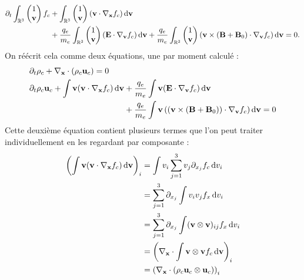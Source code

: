 $$
  \begin{aligned}
  \partial_t\int_{\mathbb{R}^3} \begin{pmatrix}
    1 \\
    \vb{v}
  \end{pmatrix}f_c
  &+
  \int_{\mathbb{R}^3}\begin{pmatrix}
    1 \\
    \vb{v}
  \end{pmatrix}(\vb{v}\cdot\nabla_{\vb{x}}f_c)\dd{\vb{v}} \\
  &+
  \frac{q_e}{m_e}\int_{\mathbb{R}^3}\begin{pmatrix}
    1 \\
    \vb{v}
  \end{pmatrix} (\vb{E}\cdot\nabla_{\vb{v}}f_c)\dd{\vb{v}}
  +
  \frac{q_e}{m_e}\int_{\mathbb{R}^3}\begin{pmatrix}
    1 \\
    \vb{v}
  \end{pmatrix}(\vb{v}\times(\vb{B}+\vb{B}_0) \cdot\nabla_{\vb{v}}f_c)\dd{\vb{v}}
  = 0.
  \end{aligned}
$$
On réécrit cela comme deux équations, une par moment calculé :
$$
  \begin{aligned}
    &\partial_t\rho_c + \nabla_{\vb{x}}\cdot(\rho_c\vb{u}_c) = 0 \\
    &\partial_t\rho_c\vb{u}_c + \int\vb{v}(\vb{v}\cdot\nabla_{\vb{x}}f_c)\dd{\vb{v}} + \frac{q_e}{m_e}\int\vb{v}(\vb{E}\cdot\nabla_{\vb{v}}f_c)\dd{\vb{v}} \\
    &\phantom{\partial_t\rho_c\vb{u}_c + \int\vb{v}(\vb{v}\cdot\nabla_{\vb{x}}f_c)\dd{\vb{v}}}
      + \frac{q_e}{m_e}\int\vb{v}\left((\vb{v}\times(\vb{B}+\vb{B}_0))\cdot\nabla_{\vb{v}}f_c\right)\dd{\vb{v}} = 0
  \end{aligned}
$$
Cette deuxième équation contient plusieurs termes que l'on peut traiter individuellement en les regardant par composante :
$$
	\begin{aligned}
    \left( \int\vb{v}(\vb{v}\cdot\nabla_{\vb{x}}f_c)\dd{\vb{v}} \right)_i
    		&= \int v_i \sum_{j=1}^3v_j\partial_{x_j}f_c\dd{v_i} \\
				&= \sum_{j=1}^3\partial_{x_j}\int v_iv_jf_x\dd{v_i} \\
				&= \sum_{j=1}^3\partial_{x_j}\int (\vb{v}\otimes\vb{v})_{ij}f_x\dd{v_i} \\
				&= \left( \nabla_{\vb{x}}\cdot\int \vb{v}\otimes\vb{v} f_c\dd{\vb{v}} \right)_i \\
				&= \left( \nabla_{\vb{x}}\cdot(\rho_c\vb{u}_c\otimes\vb{u}_c) \right)_i
  \end{aligned}
$$
